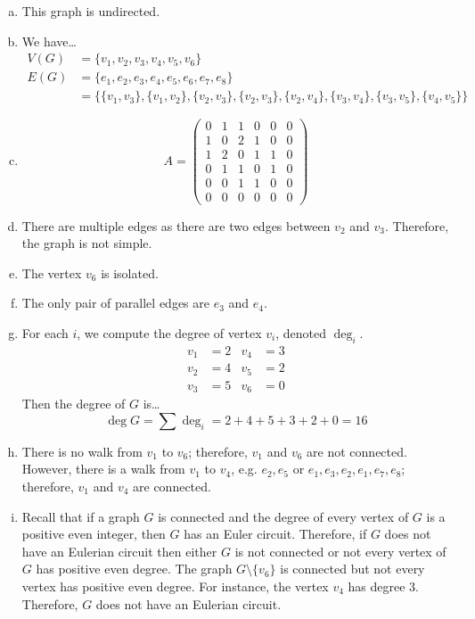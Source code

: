 \documentclass[11pt,letterpaper]{article}
\begin{document}
\sol
\begin{enumerate}[(a)]
\item This graph is undirected. 

\item We have\dots
	\[
	\begin{aligned}
	V(G)&= \{ v_1, v_2, v_3, v_4, v_5, v_6 \} \\[0.3cm]
	E(G)&= \{ e_1, e_2, e_3, e_4, e_5, e_6, e_7, e_8 \} \\
	&= \{ \{v_1, v_3\}, \{v_1, v_2\}, \{v_2, v_3\}, \{v_2, v_3\}, \{v_2, v_4\}, \{v_3, v_4\}, \{v_3, v_5\}, \{v_4, v_5\} \}
	\end{aligned}
	\]

\item 
	\[
	A= 
	\begin{pmatrix}
	0 & 1 & 1 & 0 & 0 & 0 \\
	1 & 0 & 2 & 1 & 0 & 0 \\
	1 & 2 & 0 & 1 & 1 & 0 \\
	0 & 1 & 1 & 0 & 1 & 0 \\
	0 & 0 & 1 & 1 & 0 & 0 \\
	0 & 0 & 0 & 0 & 0 & 0 
	\end{pmatrix}
	\]

\item There are multiple edges as there are two edges between $v_2$ and $v_3$. Therefore, the graph is not simple. 

\item The vertex $v_6$ is isolated. 

\item The only pair of parallel edges are $e_3$ and $e_4$. 

\item For each $i$, we compute the degree of vertex $v_i$, denoted $\deg_i$. 
	\[
	\begin{aligned}
	v_1&= 2 & v_4&= 3 \\
	v_2&= 4 & v_5&= 2 \\
	v_3&= 5 & v_6&= 0
	\end{aligned}
	\]
Then the degree of $G$ is\dots
	\[
	\deg G= \sum \deg_i= 2 + 4 + 5 + 3 + 2 + 0= 16
	\]

\item There is no walk from $v_1$ to $v_6$; therefore, $v_1$ and $v_6$ are not connected. However, there is a walk from $v_1$ to $v_4$, e.g. $e_2, e_5$ or $e_1, e_3, e_2, e_1, e_7, e_8$; therefore, $v_1$ and $v_4$ are connected. 

\item Recall that if a graph $G$ is connected and the degree of every vertex of $G$ is a positive even integer, then $G$ has an Euler circuit. Therefore, if $G$ does not have an Eulerian circuit then either $G$ is not connected or not every vertex of $G$ has positive even degree.  The graph $G \setminus \{ v_6 \}$ is connected but not every vertex has positive even degree. For instance, the vertex $v_4$ has degree 3. Therefore, $G$ does not have an Eulerian circuit. 


\end{enumerate}
\end{document}
